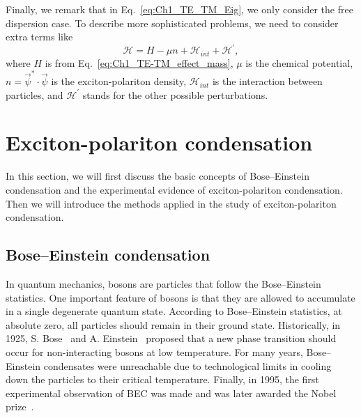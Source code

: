 Finally, we remark that in Eq.~\eqref{eq:Ch1_TE_TM_Eig}, we only consider the free dispersion case.
To describe more sophisticated problems, we need to consider extra terms like
%
\begin{equation}
    \mathcal{H} = H - \mu n + \mathcal{H}_{int} + \mathcal{H}^\prime,
    \label{eq:Ch1_TE_TM_extra}
\end{equation}
%
where $H$ is from Eq.~\eqref{eq:Ch1_TE-TM_effect_mass}, $\mu$ is the chemical potential, $n=\vec{\psi}^* \cdot \vec{\psi}$ is the exciton-polariton density, $\mathcal{H}_{int}$ is the interaction between particles, and $\mathcal{H}^\prime$ stands for the other possible perturbations.


\section{Exciton-polariton condensation}\label{se:CH1_EP-BEC}
In this section, we will first discuss the basic concepts of Bose--Einstein condensation and the experimental evidence of exciton-polariton condensation.
Then we will introduce the methods applied in the study of exciton-polariton condensation.


\subsection{Bose--Einstein condensation}
In quantum mechanics, bosons are particles that follow the Bose–Einstein statistics.
One important feature of bosons is that they are allowed to accumulate in a single degenerate quantum state.
According to Bose--Einstein statistics, at absolute zero, all particles should remain in their ground state.
Historically, in 1925, S. Bose~\cite{Bose:1924aa} and A. Einstein~\cite{Einstein:2006aa} proposed that a new phase transition should occur for non-interacting bosons at low temperature.
For many years, Bose--Einstein condensates were unreachable due to technological limits in cooling down the particles to their critical temperature.
Finally, in 1995, the first experimental observation of BEC was made and was later awarded the Nobel prize~\cite{Anderson:1995aa}.

